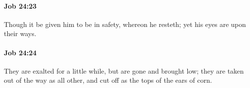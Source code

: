 		\paragraph{Job 24:23} %
			\label{JOB-24-23}

			Though it be given him to be in safety, whereon he resteth; yet his eyes are upon their ways.


		\paragraph{Job 24:24} %
			\label{JOB-24-24}

			They are exalted for a little while, but are gone and brought low; they are taken out of the way as all other, and cut off as the tops of the ears of corn.


